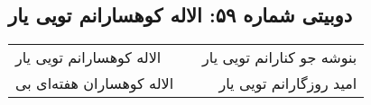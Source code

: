 \begin{center}
\section*{دوبیتی شماره ۵۹: الاله کوهسارانم تویی یار}
\label{sec:059}
\begin{longtable}{l p{0.5cm} r}
الاله کوهسارانم تویی یار
&&
بنوشه جو کنارانم تویی یار
\\
الاله کوهساران هفته‌ای بی
&&
امید روزگارانم تویی یار
\\
\end{longtable}
\end{center}
